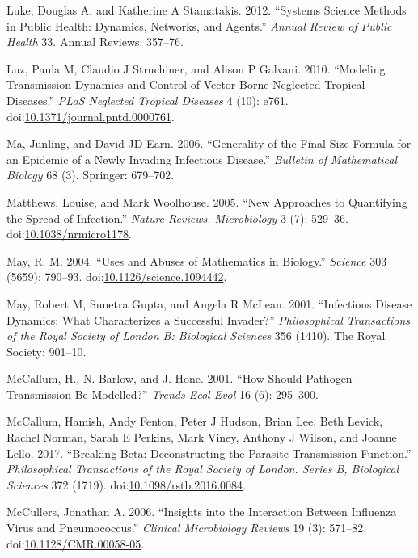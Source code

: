 \documentclass[]{book}
\theoremstyle{definition}
\theoremstyle{definition}
\theoremstyle{definition}
\theoremstyle{remark}
\begin{document}
\hypertarget{ref-luke12}{}
Luke, Douglas A, and Katherine A Stamatakis. 2012. ``Systems Science
Methods in Public Health: Dynamics, Networks, and Agents.'' \emph{Annual
Review of Public Health} 33. Annual Reviews: 357--76.

\hypertarget{ref-luz10}{}
Luz, Paula M, Claudio J Struchiner, and Alison P Galvani. 2010.
``Modeling Transmission Dynamics and Control of Vector-Borne Neglected
Tropical Diseases.'' \emph{PLoS Neglected Tropical Diseases} 4 (10):
e761.
doi:\href{https://doi.org/10.1371/journal.pntd.0000761}{10.1371/journal.pntd.0000761}.

\hypertarget{ref-ma06}{}
Ma, Junling, and David JD Earn. 2006. ``Generality of the Final Size
Formula for an Epidemic of a Newly Invading Infectious Disease.''
\emph{Bulletin of Mathematical Biology} 68 (3). Springer: 679--702.

\hypertarget{ref-matthews05}{}
Matthews, Louise, and Mark Woolhouse. 2005. ``New Approaches to
Quantifying the Spread of Infection.'' \emph{Nature Reviews.
Microbiology} 3 (7): 529--36.
doi:\href{https://doi.org/10.1038/nrmicro1178}{10.1038/nrmicro1178}.

\hypertarget{ref-may04}{}
May, R. M. 2004. ``Uses and Abuses of Mathematics in Biology.''
\emph{Science} 303 (5659): 790--93.
doi:\href{https://doi.org/10.1126/science.1094442}{10.1126/science.1094442}.

\hypertarget{ref-may01}{}
May, Robert M, Sunetra Gupta, and Angela R McLean. 2001. ``Infectious
Disease Dynamics: What Characterizes a Successful Invader?''
\emph{Philosophical Transactions of the Royal Society of London B:
Biological Sciences} 356 (1410). The Royal Society: 901--10.

\hypertarget{ref-mccallum01}{}
McCallum, H., N. Barlow, and J. Hone. 2001. ``How Should Pathogen
Transmission Be Modelled?'' \emph{Trends Ecol Evol} 16 (6): 295--300.

\hypertarget{ref-mccallum17}{}
McCallum, Hamish, Andy Fenton, Peter J Hudson, Brian Lee, Beth Levick,
Rachel Norman, Sarah E Perkins, Mark Viney, Anthony J Wilson, and Joanne
Lello. 2017. ``Breaking Beta: Deconstructing the Parasite Transmission
Function.'' \emph{Philosophical Transactions of the Royal Society of
London. Series B, Biological Sciences} 372 (1719).
doi:\href{https://doi.org/10.1098/rstb.2016.0084}{10.1098/rstb.2016.0084}.

\hypertarget{ref-mccullers06}{}
McCullers, Jonathan A. 2006. ``Insights into the Interaction Between
Influenza Virus and Pneumococcus.'' \emph{Clinical Microbiology Reviews}
19 (3): 571--82.
doi:\href{https://doi.org/10.1128/CMR.00058-05}{10.1128/CMR.00058-05}.
\end{document}
